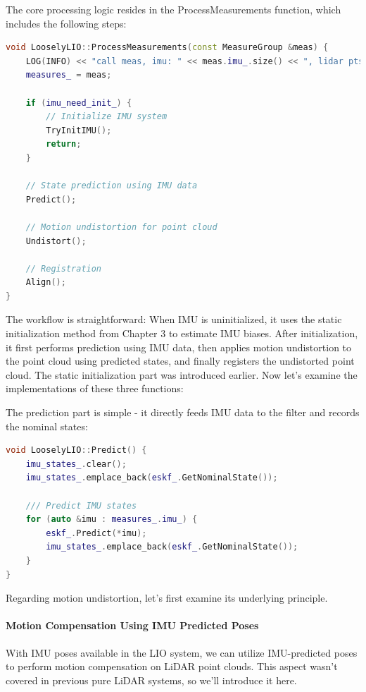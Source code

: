 The core processing logic resides in the ProcessMeasurements function, which includes the following steps:

\begin{lstlisting}[language=c++,caption=src/ch7/loosely_coupled_lio/loosly_lio.cc]
void LooselyLIO::ProcessMeasurements(const MeasureGroup &meas) {
	LOG(INFO) << "call meas, imu: " << meas.imu_.size() << ", lidar pts: " << meas.lidar_->size();
	measures_ = meas;
	
	if (imu_need_init_) {
		// Initialize IMU system
		TryInitIMU();
		return;
	}
	
	// State prediction using IMU data
	Predict();
	
	// Motion undistortion for point cloud
	Undistort();
	
	// Registration
	Align();
}
\end{lstlisting}

The workflow is straightforward: When IMU is uninitialized, it uses the static initialization method from Chapter 3 to estimate IMU biases. After initialization, it first performs prediction using IMU data, then applies motion undistortion to the point cloud using predicted states, and finally registers the undistorted point cloud. The static initialization part was introduced earlier. Now let's examine the implementations of these three functions:

The prediction part is simple - it directly feeds IMU data to the filter and records the nominal states:

\begin{lstlisting}[language=c++,caption=src/ch7/loosely_coupled_lio/loosly_lio.cc]
void LooselyLIO::Predict() {
	imu_states_.clear();
	imu_states_.emplace_back(eskf_.GetNominalState());
	
	/// Predict IMU states
	for (auto &imu : measures_.imu_) {
		eskf_.Predict(*imu);
		imu_states_.emplace_back(eskf_.GetNominalState());
	}
}
\end{lstlisting}

Regarding motion undistortion, let's first examine its underlying principle.

\paragraph{Motion Compensation Using IMU Predicted Poses}
\label{sec:motion-compensation}
With IMU poses available in the LIO system, we can utilize IMU-predicted poses to perform motion compensation on LiDAR point clouds. This aspect wasn't covered in previous pure LiDAR systems, so we'll introduce it here.

